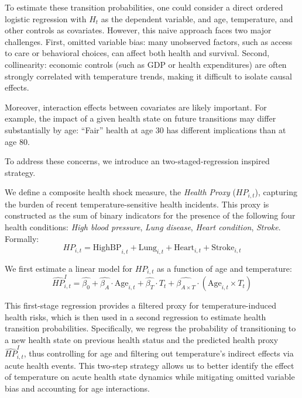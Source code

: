 \documentclass{article}
\begin{document}
To estimate these transition probabilities, one could consider a direct ordered logistic regression with $H_t$ as the dependent variable, and age, temperature, and other controls as covariates. However, this naive approach faces two major challenges. First, omitted variable bias: many unobserved factors, such as access to care or behavioral choices, can affect both health and survival. Second, collinearity: economic controls (such as GDP or health expenditures) are often strongly correlated with temperature trends, making it difficult to isolate causal effects.

Moreover, interaction effects between covariates are likely important.
For example, the impact of a given health state on future transitions may differ substantially by age: 
“Fair” health at age 30 has different implications than at age 80.

To address these concerns, we introduce an two-staged-regression inspired strategy.

We define a composite health shock measure, the \textit{Health Proxy} ($HP_{i,t}$), capturing the burden of recent temperature-sensitive health incidents.
This proxy is constructed as the sum of binary indicators for the presence of the following four health conditions:
\textit{High blood pressure},
\textit{Lung disease},
\textit{Heart condition},
\textit{Stroke}.
Formally:
\[
HP_{i,t} = \text{HighBP}_{i,t} + \text{Lung}_{i,t} + \text{Heart}_{i,t} + \text{Stroke}_{i,t}
\]

We first estimate a linear model for $HP_{i,t}$ as a function of age and temperature:
\[
\widehat{HP}_{i,t}^{I} = \widehat{\beta_0} + \widehat{\beta_A} \cdot \text{Age}_{i,t} + \widehat{\beta_T} \cdot T_t + \widehat{\beta_{A \times T}} \cdot (\text{Age}_{i,t} \times T_t)
\]

This first-stage regression provides a filtered proxy for temperature-induced health risks, which is then used in a second regression to estimate health transition probabilities. Specifically, we regress the probability of transitioning to a new health state on previous health status and the predicted health proxy $\widehat{HP}_{i,t}^{I}$, thus controlling for age and filtering out temperature's indirect effects via acute health events.
This two-step strategy allows us to better identify the effect of 
temperature on acute health state dynamics 
while mitigating omitted variable bias and accounting for age interactions.
\\
\end{document}
